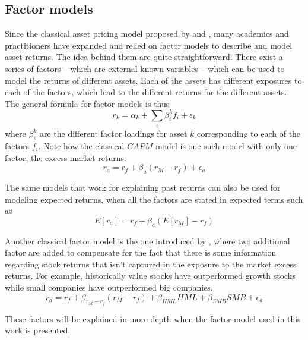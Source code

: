 \subsection{Factor models}
Since the classical asset pricing model proposed by \cite{sharpe_1964} and \cite{lintner_1975}, many academics and practitioners have expanded and relied on factor models to describe and model asset returns. The idea behind them are quite straightforward. There exist a series of factors -- which are external known variables -- which can be used to model the returns of different assets. Each of the assets has different exposures to each of the factors, which lead to the different returns for the different assets. The general formula for factor models is thus
\begin{equation}
    r_k = \alpha_k + \sum_{i}\beta_i^k f_i + \epsilon_k
\end{equation}
where $\beta_i^k$ are the different factor loadings for asset $k$ corresponding to each of the factors $f_i$. 
Note how the classical $CAPM$ model is one such model with only one factor, the excess market returns. 
\begin{equation}
    r_a=r_f+\beta_a(r_M-r_f) + \epsilon_a    
\end{equation}

The same models that work for explaining past returns can also be used for modeling expected returns, when all the factors are stated in expected terms such as
\begin{equation}
    E\left[r_a\right]=r_f+\beta_a(E\left[r_M\right]-r_f)
\end{equation}

Another classical factor model is the one introduced by \cite{french_1992}, where two additional factor are added to compensate for the fact that there is some information regarding stock returns that isn't captured in the exposure to the market excess returns. For example, historically value stocks have outperformed growth stocks while small companies have outperformed big companies.
\begin{equation}
    r_a=r_f + \beta_{r_M-r_f}(r_M-r_f) + \beta_{HML}HML + \beta_{SMB}SMB + \epsilon_a
\end{equation}

These factors will be explained in more depth when the factor model used in this work is presented. 

